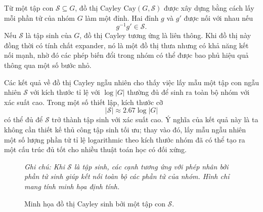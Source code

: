 Từ một tập con $\mathcal{S} \subseteq G$, đồ thị Cayley $\mathrm{Cay}(G,\mathcal{S})$ được xây dựng bằng cách lấy mỗi phần tử của nhóm $G$ làm một đỉnh. Hai đỉnh $g$ và $g'$ được nối với nhau nếu
\begin{equation}
    g^{-1}g' \in \mathcal{S}.
    \label{eq:cayley-edge}
\end{equation}
Nếu $\mathcal{S}$ là tập sinh của $G$, đồ thị Cayley tương ứng là liên thông. Khi đồ thị này đồng thời có tính chất expander, nó là một đồ thị thưa nhưng có khả năng kết nối mạnh, nhờ đó các phép biến đổi trong nhóm có thể được bao phủ hiệu quả thông qua một số bước nhỏ.

Các kết quả về đồ thị Cayley ngẫu nhiên cho thấy việc lấy mẫu một tập con ngẫu nhiên $\mathcal{S}$ với kích thước tỉ lệ với $\log |G|$ thường đủ để sinh ra toàn bộ nhóm với xác suất cao. Trong một số thiết lập, kích thước cỡ
\begin{equation}
    |\mathcal{S}| \approx 2.67 \log |G|
    \label{eq:random-generator-size}
\end{equation}
có thể đủ để $\mathcal{S}$ trở thành tập sinh với xác suất cao. Ý nghĩa của kết quả này là ta không cần thiết kế thủ công tập sinh tối ưu; thay vào đó, lấy mẫu ngẫu nhiên một số lượng phần tử tỉ lệ logarithmic theo kích thước nhóm đã có thể tạo ra một cấu trúc đủ tốt cho nhiều thuật toán học có đối xứng.

\begin{figure}[H]
    \centering
    
    \caption[Minh họa đồ thị Cayley sinh bởi một tập con $\mathcal{S}$]{Minh họa đồ thị Cayley sinh bởi một tập con $\mathcal{S}$.}
    \label{fig:cayley-expander}
    
    \vspace{0.15cm}
    \begin{minipage}{0.9\linewidth}
        \centering
        \small\textit{Ghi chú: Khi $\mathcal{S}$ là tập sinh, các cạnh tương ứng với phép nhân bởi phần tử sinh giúp kết nối toàn bộ các phần tử của nhóm. Hình chỉ mang tính minh họa định tính.}
    \end{minipage}
\end{figure}

